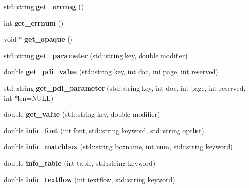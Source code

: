 \begin{DoxyCompactItemize}
\item 
\hypertarget{classPDFlib_aa36d3f54ab4dffc2efaad369bb9257f8}{}\label{classPDFlib_aa36d3f54ab4dffc2efaad369bb9257f8} 
std\+::string {\bfseries get\+\_\+errmsg} ()
\item 
\hypertarget{classPDFlib_aa22b55c8aeb8c8bc42cc286003c29074}{}\label{classPDFlib_aa22b55c8aeb8c8bc42cc286003c29074} 
int {\bfseries get\+\_\+errnum} ()
\item 
\hypertarget{classPDFlib_a5b52bcdf06c0ca3c3a26ac8e07665266}{}\label{classPDFlib_a5b52bcdf06c0ca3c3a26ac8e07665266} 
void $\ast$ {\bfseries get\+\_\+opaque} ()
\item 
\hypertarget{classPDFlib_ad22c14b9973d0d40464ef06fa69d3272}{}\label{classPDFlib_ad22c14b9973d0d40464ef06fa69d3272} 
std\+::string {\bfseries get\+\_\+parameter} (std\+::string key, double modifier)
\item 
\hypertarget{classPDFlib_a29235793f31c496e5882e9000b80045e}{}\label{classPDFlib_a29235793f31c496e5882e9000b80045e} 
double {\bfseries get\+\_\+pdi\+\_\+value} (std\+::string key, int doc, int page, int reserved)
\item 
\hypertarget{classPDFlib_a7dad0e3b7c73641122eae3258a9fea15}{}\label{classPDFlib_a7dad0e3b7c73641122eae3258a9fea15} 
std\+::string {\bfseries get\+\_\+pdi\+\_\+parameter} (std\+::string key, int doc, int page, int reserved, int $\ast$len=N\+U\+LL)
\item 
\hypertarget{classPDFlib_a203140e53fe8f2e3660f2173a88c6f5b}{}\label{classPDFlib_a203140e53fe8f2e3660f2173a88c6f5b} 
double {\bfseries get\+\_\+value} (std\+::string key, double modifier)
\item 
\hypertarget{classPDFlib_a4691e67c4af969f8a30a27c67d0c7281}{}\label{classPDFlib_a4691e67c4af969f8a30a27c67d0c7281} 
double {\bfseries info\+\_\+font} (int font, std\+::string keyword, std\+::string optlist)
\item 
\hypertarget{classPDFlib_ab87d9425f72659393e4c82a3b70ad29e}{}\label{classPDFlib_ab87d9425f72659393e4c82a3b70ad29e} 
double {\bfseries info\+\_\+matchbox} (std\+::string boxname, int num, std\+::string keyword)
\item 
\hypertarget{classPDFlib_a8b9bee8fcc7b13463c134aadc202f237}{}\label{classPDFlib_a8b9bee8fcc7b13463c134aadc202f237} 
double {\bfseries info\+\_\+table} (int table, std\+::string keyword)
\item 
\hypertarget{classPDFlib_a8c325dd615c090dbc8c3a1a2c6be1c27}{}\label{classPDFlib_a8c325dd615c090dbc8c3a1a2c6be1c27} 
double {\bfseries info\+\_\+textflow} (int textflow, std\+::string keyword)

\end{DoxyCompactItemize}
